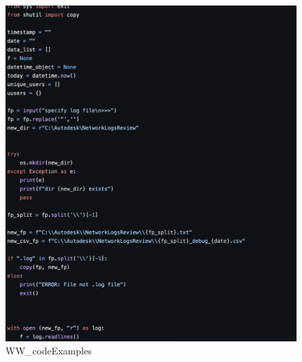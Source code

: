 \documentclass[
]{article}
\begin{document}
\begin{figure}[H]

{\centering \includegraphics{assets/WeWork/CODEEXAMPLE2.png}

}

\caption{WW\_codeExamples}

\end{figure}%
\end{document}
